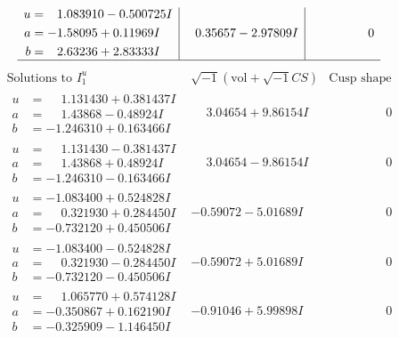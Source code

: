 \documentclass[1p]{elsarticle_modified}
\theoremstyle{definition}
\newcommand{\I}{\sqrt{-1}}
\begin{document}
$$\begin{array}{c|c|c}
\begin{aligned}
u &= \phantom{-}1.083910 - 0.500725 I \\
a &= -1.58095 + 0.11969 I \\
b &= \phantom{-}2.63236 + 2.83333 I\end{aligned}
 & \phantom{-}0.35657 - 2.97809 I & \phantom{-0.000000 } 0\\
 \hline 
 \end{array}$$\newpage$$\begin{array}{c|c|c}  
\text{Solutions to }I^u_{1}& \I (\text{vol} + \sqrt{-1}CS) & \text{Cusp shape}\\
 \hline 
\begin{aligned}
u &= \phantom{-}1.131430 + 0.381437 I \\
a &= \phantom{-}1.43868 - 0.48924 I \\
b &= -1.246310 + 0.163466 I\end{aligned}
 & \phantom{-}3.04654 + 9.86154 I & \phantom{-0.000000 } 0 \\ \hline\begin{aligned}
u &= \phantom{-}1.131430 - 0.381437 I \\
a &= \phantom{-}1.43868 + 0.48924 I \\
b &= -1.246310 - 0.163466 I\end{aligned}
 & \phantom{-}3.04654 - 9.86154 I & \phantom{-0.000000 } 0 \\ \hline\begin{aligned}
u &= -1.083400 + 0.524828 I \\
a &= \phantom{-}0.321930 + 0.284450 I \\
b &= -0.732120 + 0.450506 I\end{aligned}
 & -0.59072 - 5.01689 I & \phantom{-0.000000 } 0 \\ \hline\begin{aligned}
u &= -1.083400 - 0.524828 I \\
a &= \phantom{-}0.321930 - 0.284450 I \\
b &= -0.732120 - 0.450506 I\end{aligned}
 & -0.59072 + 5.01689 I & \phantom{-0.000000 } 0 \\ \hline\begin{aligned}
u &= \phantom{-}1.065770 + 0.574128 I \\
a &= -0.350867 + 0.162190 I \\
b &= -0.325909 - 1.146450 I\end{aligned}
 & -0.91046 + 5.99898 I & \phantom{-0.000000 } 0 \\ \hline\begin{aligned}

\end{aligned}
\end{array}$$
\end{document}
